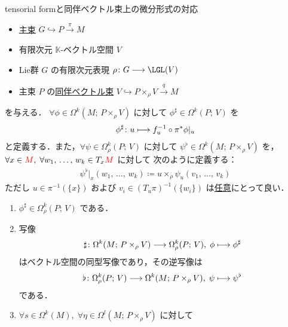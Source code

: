 \documentclass[TQFT_main]{subfiles}
\begin{document}
\begin{myprop}[label=prop:assoc-basic]{tensorial formと同伴ベクトル束上の微分形式の対応}
    \begin{itemize}
        \item \hyperref[def.PFD]{主束} $G \hookrightarrow P \xrightarrow{\pi} M$
        \item 有限次元 $\mathbb{K}$-ベクトル空間 $V$
        \item Lie群 $G$ の有限次元表現 $\rho \colon G \lto \LGL(V)$
        \item 主束 $P$ の\hyperref[def:associated-vect]{同伴ベクトル束} $V \hookrightarrow P \times_\rho V \xrightarrow{q} M$
    \end{itemize}
    を与える．
    $\forall \phi \in \Omega^k (M;\, P \times_\rho V)$ に対して
    $\phi^\sharp \in \Omega^k (P;\, V)$ を
    \begin{align}
        \phi^\sharp \colon u \longmapsto f_u^{-1} \circ \pi^* \phi|_u
    \end{align}
    と定義する．また，$\forall \psi \in \Omega_\rho^k (P;\, V)$ に対して $\psi^\flat \in \Omega^k (M;\, P \times_\rho V)$ を，$\forall x \in \textcolor{red}{M},\; \forall w_1,\, \dots,\, w_k \in T_x \textcolor{red}{M}$ に対して
    次のように定義する：
    \begin{align}
        \label{def:flat}
        \psi^\flat|_x (w_1,\, \dots,\, w_k) \coloneqq u \times_\rho \psi_u (v_1,\, \dots,\, v_k)
    \end{align}
    ただし $u \in \pi^{-1}(\{x\})$ および $v_i \in (T_u \pi)^{-1} (\{w_i\})$ は\underline{任意}にとって良い．
    \begin{enumerate}
        \item $\phi^\sharp \in \Omega^k_\rho (P;\, V)$ である．
        \item 写像
        \begin{align}
            \sharp \colon \Omega^k (M;\, P \times_\rho V) \longrightarrow \Omega^k_\rho(P;\, V),\; \phi \longmapsto \phi^\sharp    
        \end{align}
        はベクトル空間の同型写像であり，その逆写像は
        \begin{align}
            \flat \colon \Omega^k_\rho(P;\, V) \longrightarrow \Omega^k (M;\, P \times_\rho V),\; \psi \longmapsto \psi^\flat
        \end{align}
        である．
        \item $\forall s \in \Omega^k(M),\; \forall \eta \in \Omega^l(M;\, P \times_\rho V)$ に対して

\end{enumerate}
\end{myprop}
\end{document}
